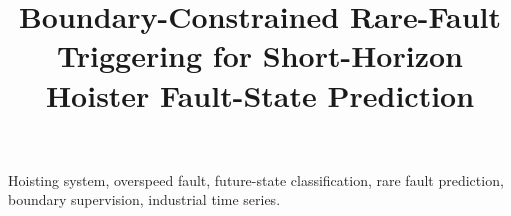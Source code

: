 \documentclass[conference]{IEEEtran}
\title{Boundary-Constrained Rare-Fault Triggering for Short-Horizon Hoister Fault-State Prediction}
\author{
\IEEEauthorblockN{Anonymous Authors}
\IEEEauthorblockA{Draft prepared for IEEE conference style submission}
}
\begin{document}
\maketitle

\begin{abstract}

\end{abstract}

\begin{IEEEkeywords}
Hoisting system, overspeed fault, future-state classification, rare fault prediction, boundary supervision, industrial time series.
\end{IEEEkeywords}









\end{document}
